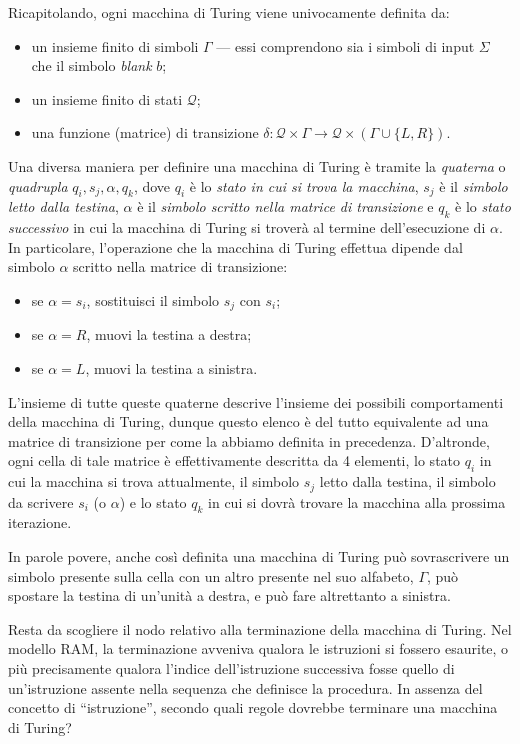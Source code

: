 \documentclass[10pt]{\classname}
\theoremstyle{definition}
\theoremstyle{definition}
\theoremstyle{definition}
\theoremstyle{definition}
\begin{document}
Ricapitolando, ogni macchina di Turing viene univocamente definita da:
\begin{itemize}
    \item un insieme finito di simboli $\Gamma$ --- essi comprendono sia i
        simboli di input $\Sigma$ che il simbolo \emph{blank} $b$;
    \item un insieme finito di stati $\mathcal Q$;
    \item una funzione (matrice) di transizione $\delta  : \mathcal Q \times
        \Gamma \rightarrow \mathcal Q \times (\Gamma \cup \{L,R\})$.
\end{itemize}

Una diversa maniera per definire una macchina di Turing è tramite la
\emph{quaterna} o \emph{quadrupla} $q_i, s_j, \alpha, q_k$, dove $q_i$ è lo
\emph{stato in cui si trova la macchina}, $s_j$ è il \emph{simbolo letto dalla
testina}, $\alpha$ è il \emph{simbolo scritto nella matrice di transizione} e
$q_k$ è lo \emph{stato successivo} in cui la macchina di Turing si troverà al
termine dell'esecuzione di $\alpha$. In particolare, l'operazione che la
macchina di Turing effettua dipende dal simbolo $\alpha$ scritto nella matrice
di transizione:
\begin{itemize}
    \item se $\alpha = s_i$, sostituisci il simbolo $s_j$ con $s_i$;
    \item se $\alpha = R$, muovi la testina a destra;
    \item se $\alpha = L$, muovi la testina a sinistra.
\end{itemize}

L'insieme di tutte queste quaterne descrive l'insieme dei possibili
comportamenti della macchina di Turing, dunque questo elenco è del tutto
equivalente ad una matrice di transizione per come la abbiamo definita in
precedenza. D'altronde, ogni cella di tale matrice è effettivamente descritta da 4 elementi, lo stato $q_i$ in cui la macchina si trova attualmente, il simbolo $s_j$ letto dalla testina, il simbolo da scrivere $s_i$ (o $\alpha$) e lo stato $q_k$ in cui si dovrà trovare la macchina alla prossima iterazione.

In parole povere, anche così definita una macchina di Turing può sovrascrivere
un simbolo presente sulla cella con un altro presente nel suo alfabeto,
$\Gamma$, può spostare la testina di un'unità a destra, e può fare altrettanto
a sinistra.

Resta da scogliere il nodo relativo alla terminazione della macchina di Turing.
Nel modello RAM, la terminazione avveniva qualora le istruzioni si fossero
esaurite, o più precisamente qualora l'indice dell'istruzione successiva fosse
quello di un'istruzione assente nella sequenza che definisce la procedura. In
assenza del concetto di ``istruzione'', secondo quali regole dovrebbe terminare
una macchina di Turing?
\end{document}
